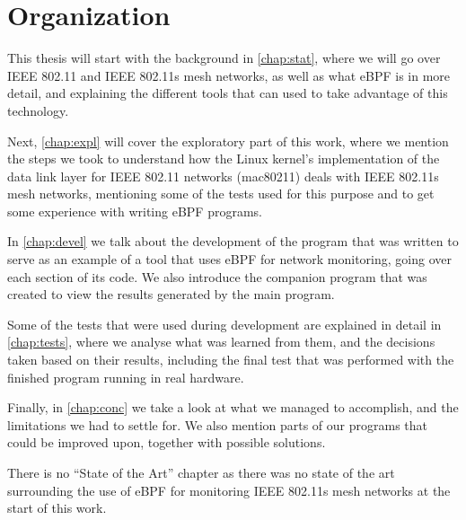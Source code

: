 \section{Organization}

This thesis will start with the background in \autoref{chap:stat}, where we will
go over \ac{IEEE} 802.11 and \ac{IEEE} 802.11s mesh networks, as well as what
eBPF is in more detail, and explaining the different tools that can used to take
advantage of this technology.

Next, \autoref{chap:expl} will cover the exploratory part of this work, where we
mention the steps we took to understand how the Linux kernel's implementation of
the data link layer for \ac{IEEE} 802.11 networks (mac80211) deals with
\ac{IEEE} 802.11s mesh networks, mentioning some of the tests used for this
purpose and to get some experience with writing eBPF programs.

In \autoref{chap:devel} we talk about the development of the program that was
written to serve as an example of a tool that uses eBPF for network monitoring,
going over each section of its code. We also introduce the companion program
that was created to view the results generated by the main program.

Some of the tests that were used during development are explained in detail in
\autoref{chap:tests}, where we analyse what was learned from them, and the
decisions taken based on their results, including the final test that was
performed with the finished program running in real hardware.

Finally, in \autoref{chap:conc} we take a look at what we managed to accomplish,
and the limitations we had to settle for. We also mention parts of our programs
that could be improved upon, together with possible solutions.

There is no ``State of the Art'' chapter as there was no state of the art
surrounding the use of eBPF for monitoring \ac{IEEE} 802.11s mesh networks at
the start of this work.
